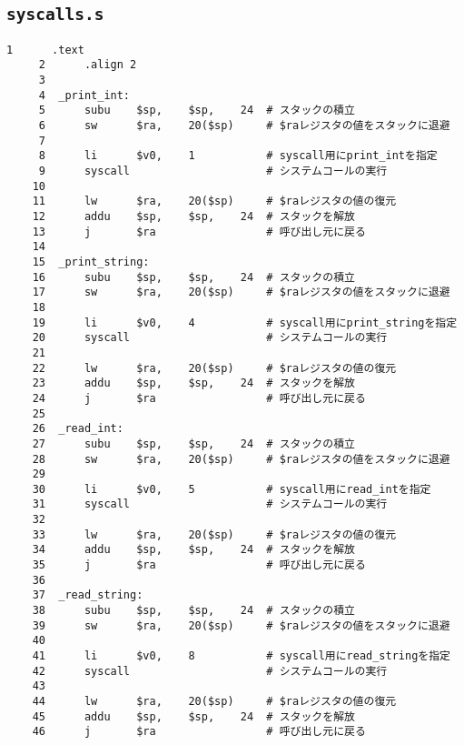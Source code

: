 
\subsection{\texttt{syscalls.s}} \label{sec:syscall}
\begin{Verbatim}[fontsize=\small, baselinestretch=0.8]
     1      .text
     2      .align 2
     3
     4  _print_int:
     5      subu    $sp,    $sp,    24  # スタックの積立
     6      sw      $ra,    20($sp)     # $raレジスタの値をスタックに退避
     7
     8      li      $v0,    1           # syscall用にprint_intを指定
     9      syscall                     # システムコールの実行
    10
    11      lw      $ra,    20($sp)     # $raレジスタの値の復元
    12      addu    $sp,    $sp,    24  # スタックを解放
    13      j       $ra                 # 呼び出し元に戻る
    14
    15  _print_string:
    16      subu    $sp,    $sp,    24  # スタックの積立
    17      sw      $ra,    20($sp)     # $raレジスタの値をスタックに退避
    18
    19      li      $v0,    4           # syscall用にprint_stringを指定
    20      syscall                     # システムコールの実行
    21
    22      lw      $ra,    20($sp)     # $raレジスタの値の復元
    23      addu    $sp,    $sp,    24  # スタックを解放
    24      j       $ra                 # 呼び出し元に戻る
    25
    26  _read_int:
    27      subu    $sp,    $sp,    24  # スタックの積立
    28      sw      $ra,    20($sp)     # $raレジスタの値をスタックに退避
    29
    30      li      $v0,    5           # syscall用にread_intを指定
    31      syscall                     # システムコールの実行
    32
    33      lw      $ra,    20($sp)     # $raレジスタの値の復元
    34      addu    $sp,    $sp,    24  # スタックを解放
    35      j       $ra                 # 呼び出し元に戻る
    36
    37  _read_string:
    38      subu    $sp,    $sp,    24  # スタックの積立
    39      sw      $ra,    20($sp)     # $raレジスタの値をスタックに退避
    40
    41      li      $v0,    8           # syscall用にread_stringを指定
    42      syscall                     # システムコールの実行
    43
    44      lw      $ra,    20($sp)     # $raレジスタの値の復元
    45      addu    $sp,    $sp,    24  # スタックを解放
    46      j       $ra                 # 呼び出し元に戻る
\end{Verbatim}

